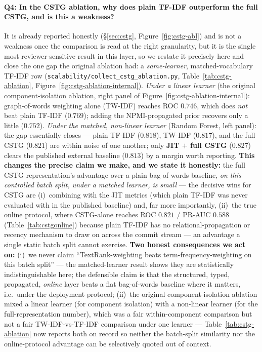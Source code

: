 \documentclass[11pt,a4paper]{article}
\newcommand{\code}[1]{\texttt{#1}}
\begin{document}
	\paragraph{Q4: In the CSTG ablation, why does plain TF-IDF outperform the full
	CSTG, and is this a weakness?} It is already reported honestly
	(\S\ref{sec:cstg}, Figure~\ref{fig:cstg-abl}) and is not a weakness once the
	comparison is read at the right granularity, but it is the single most
	reviewer-sensitive result in this layer, so we restate it precisely here and
	close the one gap the original ablation had: a \emph{same-learner},
	matched-vocabulary TF-IDF row (\code{scalability/collect\_cstg\_ablation.py},
	Table~\ref{tab:cstg-ablation}, Figure~\ref{fig:cstg-ablation-internal}).
	\emph{Under a linear learner} (the original component-isolation ablation,
	right panel of Figure~\ref{fig:cstg-ablation-internal}): graph-of-words
	weighting alone (TW-IDF) reaches ROC $0.746$, which does \emph{not} beat plain
	TF-IDF ($0.769$); adding the NPMI-propagated prior recovers only a little
	($0.752$). \emph{Under the matched, non-linear learner} (Random Forest, left
	panel): the gap essentially closes --- plain TF-IDF ($0.818$), TW-IDF
	($0.817$), and the full CSTG ($0.821$) are within noise of one another; only
	\textbf{JIT $+$ full CSTG} ($0.827$) clears the published external baseline
	($0.813$) by a margin worth reporting. \textbf{This changes the precise claim
	we make, and we state it honestly:} the full CSTG representation's advantage
	over a plain bag-of-words baseline, \emph{on this controlled batch split, under
	a matched learner, is small} --- the decisive wins for CSTG are (i)~combining
	with the JIT metrics (which plain TF-IDF was never evaluated with in the
	published baseline) and, far more importantly, (ii)~the true online protocol,
	where CSTG-alone reaches ROC $0.821$ / PR-AUC $0.588$
	(Table~\ref{tab:cstgonline}) because plain TF-IDF has no relational-propagation
	or recency mechanism to draw on across the commit stream --- an advantage a
	single static batch split cannot exercise. \textbf{Two honest consequences we
	act on:} (i)~we never claim ``TextRank-weighting beats term-frequency-weighting
	on this batch split'' --- the matched-learner result shows they are
	statistically indistinguishable here; the defensible claim is that the
	structured, typed, propagated, \emph{online} layer beats a flat bag-of-words
	baseline where it matters, i.e.\ under the deployment protocol; (ii)~the
	original component-isolation ablation mixed a linear learner (for component
	isolation) with a non-linear learner (for the full-representation number),
	which was a fair within-component comparison but not a fair TW-IDF-vs-TF-IDF
	comparison under one learner --- Table~\ref{tab:cstg-ablation} now reports both
	on record so neither the batch-split similarity nor the online-protocol
	advantage can be selectively quoted out of context.
\end{document}

